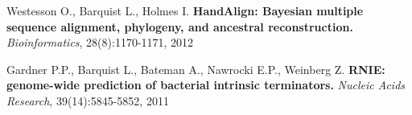 \item{Westesson O., Barquist L., Holmes I. \textbf{HandAlign: Bayesian multiple sequence alignment, phylogeny, and ancestral reconstruction.} \textit{Bioinformatics}, 28(8):1170-1171, 2012}

\item{Gardner P.P., Barquist L., Bateman A., Nawrocki E.P., Weinberg Z. \textbf{RNIE: genome-wide prediction of bacterial intrinsic terminators.} \textit{Nucleic Acids Research}, 39(14):5845-5852, 2011}



 

